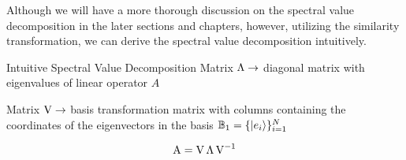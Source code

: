 Although we will have a more thorough discussion on the spectral value decomposition in the later sections and chapters, however, utilizing the similarity transformation, we can derive the spectral value decomposition intuitively.

\begin{example}{Intuitive Spectral Value Decomposition}
	Matrix $ \operatorname{\Lambda} \rightarrow $ diagonal matrix with eigenvalues of linear operator $ A $
	
	Matrix $ \operatorname{V} \rightarrow $ basis transformation matrix with columns containing the coordinates of the eigenvectors in the basis $ \mathbb{B}_{1} = \{ \ket{{e}_{i}} \}_{i=1}^{N} $
	
	\[ \operatorname{A} = \operatorname{V} \operatorname{\Lambda} \operatorname{V}^{-1} \]
\end{example}








